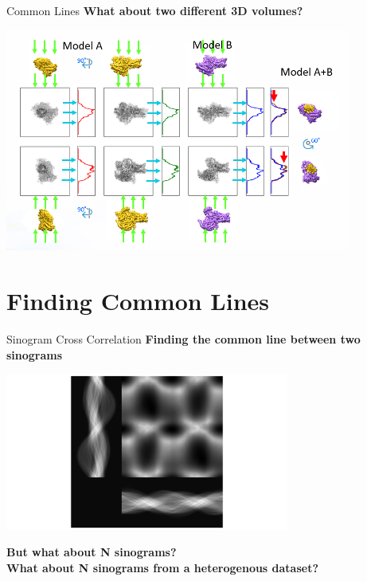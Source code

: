 \documentclass[t, 11pt, xcolor=dvipsnames]{beamer}
\begin{document}
\begin{frame}[fragile]{Common Lines}
  \centering\textbf{What about two different 3D volumes?}
 \begin{center}\includegraphics[width=0.85\textwidth]{images/lines_two_models.png}
    \end{center}
\end{frame}

\section{Finding Common Lines}

\begin{frame}[fragile]{Sinogram Cross Correlation}
  \centering\textbf{Finding the common line between two sinograms}
  \begin{center}\includegraphics[width=0.7\textwidth]{images/2sin_comp.png}
    \end{center}
  \pause
  \centering\textbf{But what about N sinograms?} \\
  \pause
  \centering\textbf{What about N sinograms from a heterogenous dataset?}

\end{frame}
\end{document}
